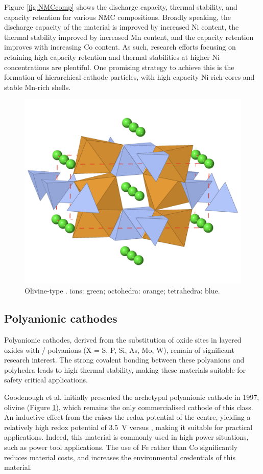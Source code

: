 Figure \ref{fig:NMCcomp} shows the discharge capacity, thermal stability, and capacity retention for various NMC compositions.
Broadly speaking, the discharge capacity of the material is improved by increased Ni content, the thermal stability improved by increased Mn content, and the capacity retention improves with increasing Co content.
As such, research efforts focusing on retaining high capacity retention and thermal stabilities at higher Ni concentrations are plentiful.
One promising strategy to achieve this is the formation of hierarchical cathode particles, with high capacity Ni-rich cores and stable Mn-rich shells. \cite{Zhou2018}
\newpage
\begin{figure}
\centering
\includegraphics[width=0.6\linewidth]{figures/structures/LiFePO4}

\caption[Olivine-type ]{Olivine-type .   ions: green;  octohedra: orange;  tetrahedra: blue.} 
\label{fig:polyanion}
\end{figure}

\subsection{Polyanionic cathodes}
Polyanionic cathodes, derived from the substitution of oxide sites in layered oxides with / polyanions (X = S, P, Si, As, Mo, W),\cite{Gong2011a} remain of significant research interest.
The strong covalent bonding between these polyanions and  polyhedra leads to high thermal stability, making these materials suitable for safety critical applications.\cite{Nitta2015}

Goodenough et al.\cite{Padhi1997} initially presented the archetypal polyanionic cathode in 1997, olivine  (Figure \ref{fig:polyanion}), which remains the only commercialised cathode of this class.
An inductive effect from the  raises the redox potential of the  centre, yielding a relatively high  redox potential of \SI{3.5}{\volt} versus , making it suitable for practical applications.
Indeed, this material is commonly used in high power situations, such as power tool applications.
The use of Fe rather than Co significantly reduces material costs, and increases the environmental credentials of this material.

